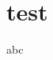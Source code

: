 \documentclass[
hyperref={colorlinks}
]{beamer}
\begin{document}
\section{test}
\begin{frame}
    abc
\end{frame} 
\end{document}
